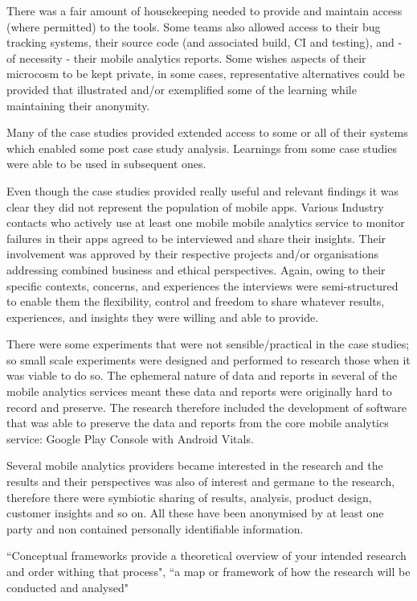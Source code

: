 There was a fair amount of housekeeping needed to provide and maintain access (where permitted) to the tools. Some teams also allowed access to their bug tracking systems, their source code (and associated build, CI and testing), and - of necessity - their mobile analytics reports. Some wishes aspects of their microcosm to be kept private, in some cases, representative alternatives could be provided that illustrated and/or exemplified some of the learning while maintaining their anonymity.  

Many of the case studies provided extended access to some or all of their systems which enabled some post case study analysis. Learnings from some case studies were able to be used in subsequent ones.

Even though the case studies provided really useful and relevant findings it was clear they did not represent the population of mobile apps. Various Industry contacts who actively use at least one mobile mobile analytics service to monitor failures in their apps agreed to be interviewed and share their insights. Their involvement was approved by their respective projects and/or organisations addressing combined business and ethical perspectives. Again, owing to their specific contexts, concerns, and experiences the interviews were semi-structured to enable them the flexibility, control and freedom to share whatever results, experiences, and insights they were willing and able to provide.

There were some experiments that were not sensible/practical in the case studies; so small scale experiments were designed and performed to research those when it was viable to do so. The ephemeral nature of data and reports in several of the mobile analytics services meant these data and reports were originally hard to record and preserve. The research therefore included the development of software that was able to preserve the data and reports from the core mobile analytics service: Google Play Console with Android Vitals.

Several mobile analytics providers became interested in the research and the results and their perspectives was also of interest and germane to the research, therefore there were symbiotic sharing of results, analysis, product design, customer insights and so on. All these have been anonymised by at least one party and non contained personally identifiable information.  

``Conceptual frameworks provide a theoretical overview of your intended research and order withing that process", ``a map or framework of how the research will be conducted and analysed"~\citep[page 44]{trafford2008_stepping_stones_to_achieving_your_doctorate}

